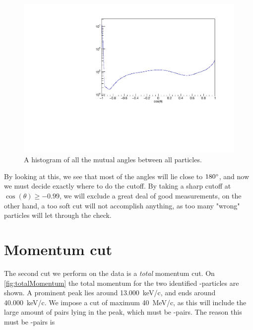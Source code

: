 \begin{figure}[h]
	\centering
	\includegraphics[width=\linewidth]{../figures/cosang.pdf}
	\caption{A histogram of all the mutual angles between all particles.}
	\label{fig:cosAll}
\end{figure}

By looking at this, we see that most of the angles will lie close to $180\degree$, and now we must decide exactly where to do the cutoff. 
By taking a sharp cutoff at $\cos(\theta) \geq -0.99$, we will exclude a great deal of good measurements, on the other hand, a too soft cut will not accomplish anything, as too many "wrong" particles will let through the check. 



\section{Momentum cut}
The second cut we perform on the data is a \textit{total} momentum cut. On \cref{fig:totalMomentum} the total momentum for the two identified \al-particles are shown. 
A prominent peak lies around \SI{13.000}{keV/c}, and ends around \SI{40.000 }{keV/c}. 
We impose a cut of maximum \SI{40}{MeV/c}, as this will include the large amount of pairs lying in the peak, which must be \al-\al pairs. The reason this must be \al-\al pairs is 


